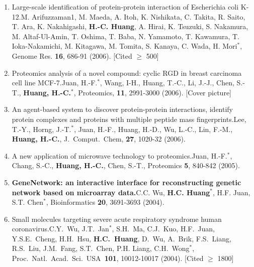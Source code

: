 \documentclass[10pt,a4paper]{article}
\def\mypub#1#2#3{{#1.}\newline #2, #3.}
\def\mybpub#1#2#3{{\boldmath \bf #1.}\newline #2, #3.}
\def\cited#1{Cited $\ge$ #1}
\def\impf#1#2{\def\tempa{}\def\tempb{#2}\ifx\tempa\tempb%
IF: #1%
\else
IF: #1, #2\%%
\fi
}
\def\iproteomics{\impf{4.586}{12.31}}
\def\igenomeres{\impf{11.224}{}}
\def\ibioinfo{\impf{5.039}{1.1}}
\def\ipnas{\impf{9.598}{}}
\def\ijcompchem{\impf{4.297}{13.3}}
\begin{document}
\begin{enumerate}
\item
\mypub{Large-scale identification of protein-protein interaction of Escherichia coli K-12}
{M. Arifuzzaman1, M. Maeda, A. Itoh, K. Nishikata, C. Takita, R. Saito, T. Ara, K. Nakahigashi, {\bf H.-C. Huang}, A. Hirai, K. Tsuzuki, S. Nakamura, M. Altaf-Ul-Amin, T. Oshima, T. Baba, N. Yamamoto, T. Kawamura, T. Ioka-Nakamichi, M. Kitagawa, M. Tomita, S. Kanaya, C. Wada, H. Mori$^*$}
{Genome Res. {\bf 16}, 686-91 (2006)}
[\cited{500}]

\item
\mypub{Proteomics analysis of a novel compound: cyclic RGD in breast carcinoma cell line MCF-7}
{Juan, H.-F.$^*$, Wang, I-H., Huang, T.-C., Li, J.-J., Chen, S.-T., {\bf Huang, H.-C.$^*$}}
{Proteomics, {\bf 11}, 2991-3000 (2006)}
[Cover picture]

\item
\mypub
{An agent-based system to discover protein-protein interactions, identify protein complexes and proteins with multiple peptide mass fingerprints}
{Lee, T.-Y., Horng, J.-T.$^*$, Juan, H.-F., Huang, H.-D., Wu, L.-C., Lin, F.-M., {\bf Huang, H.-C.}}
{J.\ Comput.\ Chem, {\bf 27}, 1020-32 (2006)}

\item
\mypub
{A new application of microwave technology to proteomics}
{Juan, H.-F.$^*$, Chang, S.-C., {\bf Huang, H.-C.}, Chen, S.-T.}
{Proteomics {\bf 5}, 840-842 (2005)}

\item 
\mybpub{GeneNetwork: an interactive interface for reconstructing genetic network based on microarray data}
{C.C. Wu, {\bf H.C. Huang$^*$}, H.F. Juan, S.T. Chen$^*$}
{Bioinformatics {\bf 20}, 3691-3693 (2004)}

\item
\mypub
{Small molecules targeting severe acute respiratory syndrome human coronavirus}
{C.Y.~Wu, J.T.~Jan$^{*}$, S.H.~Ma, C.J.~Kuo, H.F.~Juan, Y.S.E.~Cheng, H.H.~Hsu, {\bf H.C.~Huang}, D.~Wu, A.~Brik, F.S.~Liang, R.S.~Liu, J.M.~Fang, S.T.~Chen, P.H. Liang, C.H.~Wong$^{*}$}
{Proc.\ Natl.\ Acad.\ Sci.\ USA\ {\bf 101}, 10012-10017 (2004)}
[\cited{1800}]


\end{enumerate}
\end{document}
